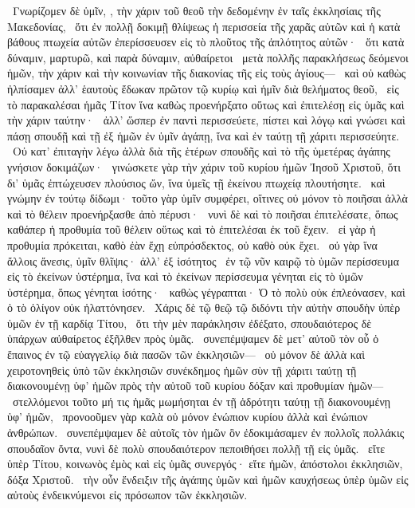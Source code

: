 ~Γνωρίζομεν δὲ ὑμῖν, , τὴν χάριν τοῦ θεοῦ τὴν δεδομένην ἐν ταῖς ἐκκλησίαις τῆς Μακεδονίας,
~ὅτι ἐν πολλῇ δοκιμῇ θλίψεως ἡ περισσεία τῆς χαρᾶς αὐτῶν καὶ ἡ κατὰ βάθους πτωχεία αὐτῶν ἐπερίσσευσεν εἰς τὸ πλοῦτος τῆς ἁπλότητος αὐτῶν·
~ὅτι κατὰ δύναμιν, μαρτυρῶ, καὶ παρὰ δύναμιν, αὐθαίρετοι
~μετὰ πολλῆς παρακλήσεως δεόμενοι ἡμῶν, τὴν χάριν καὶ τὴν κοινωνίαν τῆς διακονίας τῆς εἰς τοὺς ἁγίους—
~καὶ οὐ καθὼς ἠλπίσαμεν ἀλλ’ ἑαυτοὺς ἔδωκαν πρῶτον τῷ κυρίῳ καὶ ἡμῖν διὰ θελήματος θεοῦ,
~εἰς τὸ παρακαλέσαι ἡμᾶς Τίτον ἵνα καθὼς προενήρξατο οὕτως καὶ ἐπιτελέσῃ εἰς ὑμᾶς καὶ τὴν χάριν ταύτην·
~ἀλλ’ ὥσπερ ἐν παντὶ περισσεύετε, πίστει καὶ λόγῳ καὶ γνώσει καὶ πάσῃ σπουδῇ καὶ τῇ ἐξ ἡμῶν ἐν ὑμῖν ἀγάπῃ, ἵνα καὶ ἐν ταύτῃ τῇ χάριτι περισσεύητε.
~Οὐ κατ’ ἐπιταγὴν λέγω ἀλλὰ διὰ τῆς ἑτέρων σπουδῆς καὶ τὸ τῆς ὑμετέρας ἀγάπης γνήσιον δοκιμάζων·
~γινώσκετε γὰρ τὴν χάριν τοῦ κυρίου ἡμῶν Ἰησοῦ Χριστοῦ, ὅτι δι’ ὑμᾶς ἐπτώχευσεν πλούσιος ὤν, ἵνα ὑμεῖς τῇ ἐκείνου πτωχείᾳ πλουτήσητε.
~καὶ γνώμην ἐν τούτῳ δίδωμι· τοῦτο γὰρ ὑμῖν συμφέρει, οἵτινες οὐ μόνον τὸ ποιῆσαι ἀλλὰ καὶ τὸ θέλειν προενήρξασθε ἀπὸ πέρυσι·
~νυνὶ δὲ καὶ τὸ ποιῆσαι ἐπιτελέσατε, ὅπως καθάπερ ἡ προθυμία τοῦ θέλειν οὕτως καὶ τὸ ἐπιτελέσαι ἐκ τοῦ ἔχειν.
~εἰ γὰρ ἡ προθυμία πρόκειται, καθὸ ἐὰν ἔχῃ εὐπρόσδεκτος, οὐ καθὸ οὐκ ἔχει.
~οὐ γὰρ ἵνα ἄλλοις ἄνεσις, ὑμῖν θλῖψις· ἀλλ’ ἐξ ἰσότητος
~ἐν τῷ νῦν καιρῷ τὸ ὑμῶν περίσσευμα εἰς τὸ ἐκείνων ὑστέρημα, ἵνα καὶ τὸ ἐκείνων περίσσευμα γένηται εἰς τὸ ὑμῶν ὑστέρημα, ὅπως γένηται ἰσότης·
~καθὼς γέγραπται· Ὁ τὸ πολὺ οὐκ ἐπλεόνασεν, καὶ ὁ τὸ ὀλίγον οὐκ ἠλαττόνησεν.
~Χάρις δὲ τῷ θεῷ τῷ διδόντι τὴν αὐτὴν σπουδὴν ὑπὲρ ὑμῶν ἐν τῇ καρδίᾳ Τίτου,
~ὅτι τὴν μὲν παράκλησιν ἐδέξατο, σπουδαιότερος δὲ ὑπάρχων αὐθαίρετος ἐξῆλθεν πρὸς ὑμᾶς.
~συνεπέμψαμεν δὲ μετ’ αὐτοῦ τὸν  οὗ ὁ ἔπαινος ἐν τῷ εὐαγγελίῳ διὰ πασῶν τῶν ἐκκλησιῶν—
~οὐ μόνον δὲ ἀλλὰ καὶ χειροτονηθεὶς ὑπὸ τῶν ἐκκλησιῶν συνέκδημος ἡμῶν σὺν τῇ χάριτι ταύτῃ τῇ διακονουμένῃ ὑφ’ ἡμῶν πρὸς τὴν αὐτοῦ τοῦ κυρίου δόξαν καὶ προθυμίαν ἡμῶν—
~στελλόμενοι τοῦτο μή τις ἡμᾶς μωμήσηται ἐν τῇ ἁδρότητι ταύτῃ τῇ διακονουμένῃ ὑφ’ ἡμῶν,
~προνοοῦμεν γὰρ καλὰ οὐ μόνον ἐνώπιον κυρίου ἀλλὰ καὶ ἐνώπιον ἀνθρώπων.
~συνεπέμψαμεν δὲ αὐτοῖς τὸν  ἡμῶν ὃν ἐδοκιμάσαμεν ἐν πολλοῖς πολλάκις σπουδαῖον ὄντα, νυνὶ δὲ πολὺ σπουδαιότερον πεποιθήσει πολλῇ τῇ εἰς ὑμᾶς.
~εἴτε ὑπὲρ Τίτου, κοινωνὸς ἐμὸς καὶ εἰς ὑμᾶς συνεργός· εἴτε  ἡμῶν, ἀπόστολοι ἐκκλησιῶν, δόξα Χριστοῦ.
~τὴν οὖν ἔνδειξιν τῆς ἀγάπης ὑμῶν καὶ ἡμῶν καυχήσεως ὑπὲρ ὑμῶν εἰς αὐτοὺς ἐνδεικνύμενοι εἰς πρόσωπον τῶν ἐκκλησιῶν.

